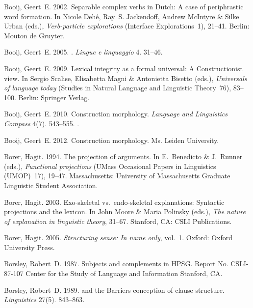 \begin{thebibliography}{1420}
Booij, Geert~E. 2002.
\newblock Separable complex verbs in {Dutch}: {A} case of periphrastic word
  formation.
\newblock In Nicole Deh{\'e}, Ray~S. Jackendoff, Andrew McIntyre \& Silke Urban
  (eds.), \emph{Verb-par\-ti\-cle explorations} (Interface Explorations~1),
  21--41. Berlin: Mouton de Gruyter.

Booij, Geert~E. 2005.
.
\newblock \emph{Lingue e linguaggio} 4. 31--46.

Booij, Geert~E. 2009.
\newblock Lexical integrity as a formal universal: {A} {Constructionist} view.
\newblock In Sergio Scalise, Elisabetta Magni \& Antonietta Bisetto (eds.),
  \emph{Universals of language today} (Studies in Natural Language and
  Linguistic Theory~76), 83--100. Berlin: Springer Verlag.

Booij, Geert~E. 2010.
\newblock Construction morphology.
\newblock \emph{Language and Linguistics Compass} 4(7). 543--555.
\newblock {}.

Booij, Geert~E. 2012.
\newblock Construction morphology.
\newblock Ms. Leiden University.

Borer, Hagit. 1994.
\newblock The projection of arguments.
\newblock In E.~Benedicto \& J.~Runner (eds.), \emph{Functional projections}
  (UMass Occasional Papers in Linguistics (UMOP)~17), 19--47. Massachusetts:
  University of {Massachusetts Graduate Linguistic Student Association}.

Borer, Hagit. 2003.
\newblock Exo-skeletal vs.\ endo-skeletal explanations: {Syntactic} projections
  and the lexicon.
\newblock In John Moore \& Maria Polinsky (eds.), \emph{The nature of
  explanation in linguistic theory}, 31--67. Stanford, CA: CSLI Publications.

Borer, Hagit. 2005.
\newblock \emph{Structuring sense: {In} name only}, vol.~1.
\newblock Oxford: Oxford University Press.

Borsley, Robert~D. 1987.
\newblock Subjects and complements in {HPSG}.
\newblock Report {No. CSLI-87-107} Center for the Study of Language and
  Information Stanford, CA.

Borsley, Robert~D. 1989.
 and the {Barriers} conception of clause
  structure.
\newblock \emph{Linguistics} 27(5). 843--863.


\end{thebibliography}
